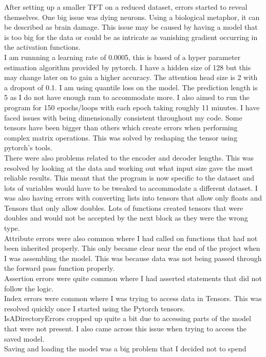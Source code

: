 \documentclass{article}
\begin{document}
After setting up a smaller TFT on a reduced dataset, errors started to reveal
themselves. One big issue was dying neurons. Using a biological metaphor,
it can be described as brain damage. This issue may be caused by having a
model that is too big for the data or could be as intricate as vanishing gradient
occurring in the activation functions.\\
I am runnning a learning rate of 0.0005, this is based of a hyper parameter
estimation algorithm provided by pytorch. I have a hidden size of 128 but this
may change later on to gain a higher accuracy. The attention head size is 2 with
a dropout of 0.1. I am using quantile loss on the model. The prediction length
is 5 as I do not have enough ram to accommodate more. I also aimed to run
the program for 150 epochs/loops with each epoch taking roughly 11 minutes.
I have faced issues with being dimensionally consistent throughout my code.
Some tensors have been bigger than others which create errors when performing
complex matrix operations. This was solved by reshaping the tensor using
pytorch’s tools.\\
There were also problems related to the encoder and decoder lengths. This was
resolved by looking at the data and working out what input size gave the most
reliable results. This meant that the program is now specific to the dataset and
lots of variables would have to be tweaked to accommodate a different dataset.
I was also having errors with converting lists into tensors that allow only floats
and Tensors that only allow doubles. Lots of functions created tensors that were
doubles and would not be accepted by the next block as they were the wrong
type.\\
Attribute errors were also common where I had called on functions that had
not been inherited properly. This only became clear near the end of the project
when I was assembling the model. This was because data was not being passed
through the forward pass function properly.\\
Assertion errors were quite common where I had asserted statements that did
not follow the logic.\\
Index errors were common where I was trying to access data in Tensors. This
was resolved quickly once I started using the Pytorch tensors.\\
IsADirectoryErrors cropped up quite a bit due to accessing parts of the model
that were not present. I also came across this issue when trying to access the
saved model.\\
Saving and loading the model was a big problem that I decided not to spend
\end{document}
